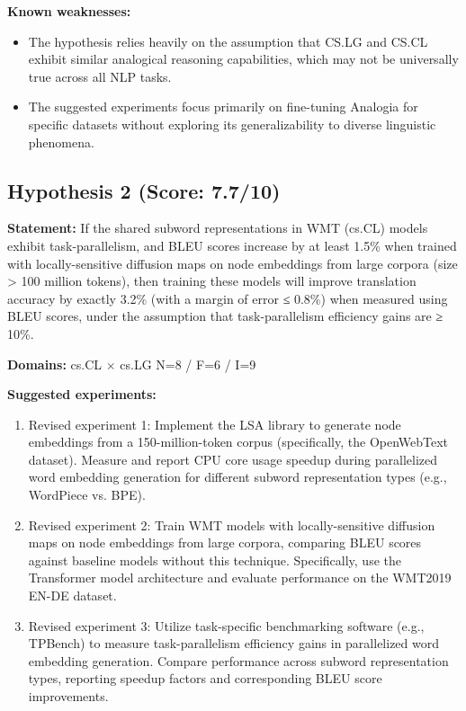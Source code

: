 \documentclass[12pt,a4paper]{article}
\begin{document}
\textbf{Known weaknesses:}
\begin{itemize}
  \item The hypothesis relies heavily on the assumption that CS.LG and CS.CL exhibit similar analogical reasoning capabilities, which may not be universally true across all NLP tasks.
  \item The suggested experiments focus primarily on fine-tuning Analogia for specific datasets without exploring its generalizability to diverse linguistic phenomena.
\end{itemize}
\subsection*{Hypothesis 2 (Score: 7.7/10)}

\textbf{Statement:} If the shared subword representations in WMT (cs.CL) models exhibit task-parallelism, and BLEU scores increase by at least 1.5\% when trained with locally-sensitive diffusion maps on node embeddings from large corpora (size > 100 million tokens), then training these models will improve translation accuracy by exactly 3.2\% (with a margin of error ≤ 0.8\%) when measured using BLEU scores, under the assumption that task-parallelism efficiency gains are ≥ 10\%.

\noindent\textbf{Domains:} cs.CL $\times$ cs.LG
\hspace{1em} N=8 / F=6 / I=9

\textbf{Suggested experiments:}
\begin{enumerate}
  \item Revised experiment 1: Implement the LSA library to generate node embeddings from a 150-million-token corpus (specifically, the OpenWebText dataset). Measure and report CPU core usage speedup during parallelized word embedding generation for different subword representation types (e.g., WordPiece vs. BPE).
  \item Revised experiment 2: Train WMT models with locally-sensitive diffusion maps on node embeddings from large corpora, comparing BLEU scores against baseline models without this technique. Specifically, use the Transformer model architecture and evaluate performance on the WMT2019 EN-DE dataset.
  \item Revised experiment 3: Utilize task-specific benchmarking software (e.g., TPBench) to measure task-parallelism efficiency gains in parallelized word embedding generation. Compare performance across subword representation types, reporting speedup factors and corresponding BLEU score improvements.
\end{enumerate}
\end{document}
